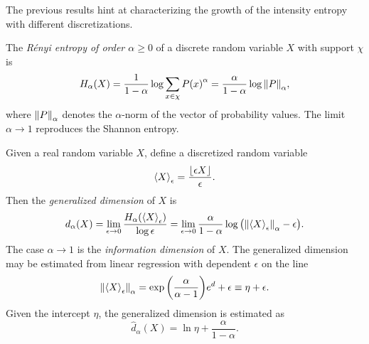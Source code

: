 \documentclass[../notebook.tex]{subfiles}
\begin{document}

The previous results hint at characterizing the growth of the intensity entropy
with different discretizations.

\begin{defn}
  The \emph{R\'enyi entropy of order $\alpha \ge 0$} of a discrete random
  variable $X$ with support $\chi$ is
  \begin{equation}
    H_\alpha(X)
    = \frac{1}{1 - \alpha}\operatorname{\mathrm{log}}\sum_{x \in \chi} {P(x)}^\alpha
    = \frac{\alpha}{1 - \alpha}\operatorname{\mathrm{log}}\norm{P}_\alpha,
    \label{eq:renyi}
  \end{equation}
  where $\norm{P}_\alpha$ denotes the $\alpha$-norm of the vector of probability
  values. The limit $\alpha \to 1$ reproduces the Shannon entropy.
\end{defn}

\begin{defn}
  Given a real random variable $X$, define a discretized random variable
  \[
    \ev{X}_\epsilon
    = \frac{\lfloor\epsilon X\rfloor}{\epsilon}.
  \]
  Then the \emph{generalized dimension} of $X$ is
  \begin{equation}
    d_\alpha(X)
    = \lim_{\epsilon \to 0} \frac{H_\alpha(\ev{X}_\epsilon)}{\log \epsilon}
    = \lim_{\epsilon \to 0} \frac{\alpha}{1 - \alpha}
    \log\qty(\norm{\ev{X}_\epsilon}_\alpha - \epsilon).
    \label{eq:gendim}
  \end{equation}
  The case $\alpha \to 1$ is the \emph{information dimension} of $X$. The
  generalized dimension may be estimated from linear regression with dependent
  $\epsilon$ on the line
  \[
    \norm{\ev{X}_\epsilon}_\alpha
    = \exp\qty(\frac{\alpha}{\alpha - 1})e^d + \epsilon
    \equiv \eta + \epsilon.
  \]
  Given the intercept $\eta$, the generalized dimension is estimated as
  \begin{equation}
    \hat{d}_\alpha(X)
    = \ln\eta + \frac{\alpha}{1 - \alpha}.
    \label{eq:gendim-est}
  \end{equation}
\end{defn}
\end{document}
